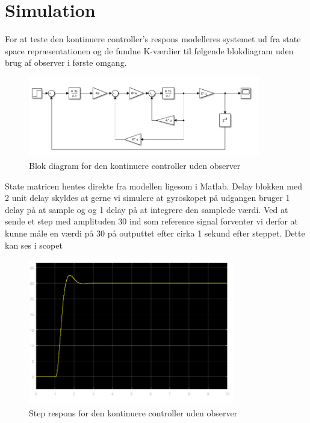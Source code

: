 \section{Simulation}
For at teste den kontinuere controller's respons modelleres systemet ud fra state space repræsentationen og de fundne K-værdier til følgende blokdiagram uden brug af observer i første omgang. 

\begin{figure}[H]
	\centering
	\includegraphics[width = 0.9\textwidth]{figur/Simulink_blokdiagram_1}
	\caption{Blok diagram for den kontinuere controller uden observer}
	\label{fig:Simulink_blokdiagram_1}
\end{figure}

State matricen hentes direkte fra modellen ligesom i Matlab. Delay blokken med 2 unit delay skyldes at gerne vi simulere at gyroskopet på udgangen bruger 1 delay på at sample og og 1 delay på at integrere den samplede værdi.
Ved at sende et step med amplituden 30 ind som reference signal forventer vi derfor at kunne måle en værdi på 30 på outputtet efter cirka 1 sekund efter steppet. Dette kan ses i scopet 

\begin{figure}[H]
	\centering
	\includegraphics[width = 0.8\textwidth]{figur/Simulink_scope_1}
	\caption{Step respons for den kontinuere controller uden observer}
	\label{fig:Simulink_scope_1}
\end{figure}

